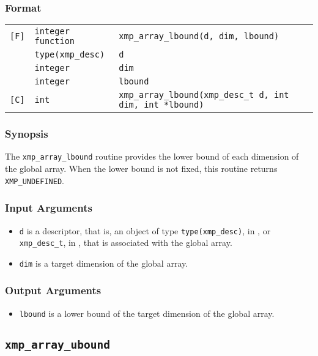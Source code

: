 \subsubsection*{Format}

\begin{tabular}{lll}

\verb![F]!& {\tt integer function}& {\tt xmp\_array\_lbound(d, dim, lbound)}\\
          & {\tt type(xmp\_desc)} & {\tt d}\\
          & {\tt integer} & {\tt dim}\\
          & {\tt integer} & {\tt lbound}\\

\verb![C]!&  {\tt int}& {\tt xmp\_array\_lbound(xmp\_desc\_t d, int dim, int *lbound)}\\

\end{tabular}

\subsubsection*{Synopsis}

The {\tt xmp\_array\_lbound} routine provides the lower bound of each dimension of the global array.
  When the lower bound is not fixed, this routine returns {\tt XMP\_UNDEFINED}.

\subsubsection*{Input Arguments}
\begin{itemize}
 \item {\tt d} is a descriptor, that is, an object of type 
       {\tt type(xmp\_desc)}, in {\XMPF}, or {\tt xmp\_desc\_t},
       in {\XMPC}, that is associated with the global array.
 \item {\tt dim} is a target dimension of the global array.
\end{itemize}

\subsubsection*{Output Arguments}
\begin{itemize}
 \item {\tt lbound} is a lower bound of the target dimension of the global array.
\end{itemize}


\subsection{\tt xmp\_array\_ubound}

